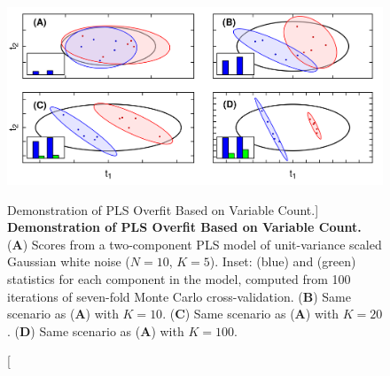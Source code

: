 \begin{figure}[ht!]
\includegraphics[width=6.5in]{figs/mva/15-overfit.png}
\caption
      [Demonstration of PLS Overfit Based on Variable Count.]{
  {\bf Demonstration of PLS Overfit Based on Variable Count.}
  \\
  ({\bf A}) Scores from a two-component PLS model of unit-variance scaled
  Gaussian white noise ($N = 10$, $K = 5$). Inset: \rsqy{} (blue) and \qsq{}
  (green) statistics for each component in the model, computed from 100
  iterations of seven-fold Monte Carlo cross-validation.
  ({\bf B}) Same scenario as ({\bf A}) with $K = 10$.
  ({\bf C}) Same scenario as ({\bf A}) with $K = 20$.
  ({\bf D}) Same scenario as ({\bf A}) with $K = 100$.
}
\end{figure}

